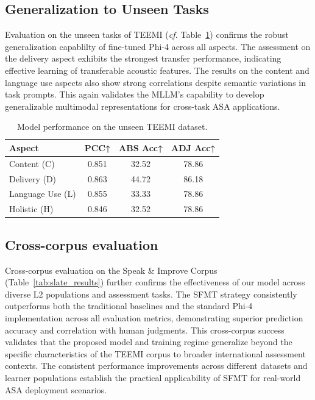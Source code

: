 \documentclass[conference]{IEEEtran}
\begin{document}
\subsection{Generalization to Unseen Tasks}
Evaluation on the unseen tasks of TEEMI (\textit{cf.} Table~\ref{tab:unseen_results}) confirms the robust generalization capablilty of fine-tuned Phi-4 across all aspects. The assessment on the delivery aspect exhibits the strongest transfer performance, indicating effective learning of transferable acoustic features. The results on the content and language use aspects also show strong correlations despite semantic variations in task prompts. This again validates the MLLM's capability to develop generalizable multimodal representations for cross-task ASA applications.

\begin{table}[!ht]
\centering
\caption{Model performance on the unseen TEEMI dataset.}
\label{tab:unseen_results}
\begin{tabular}{@{}l ccc@{}}
\toprule
\textbf{Aspect} & \textbf{PCC↑} & \textbf{ABS Acc↑} & \textbf{ADJ Acc↑} \\
\midrule
Content (C)      & 0.851         & 32.52             & 78.86             \\
Delivery (D) & 0.863         & 44.72             & 86.18             \\
Language Use (L)   & 0.855         & 33.33             & 78.86             \\
Holistic (H)     & 0.846         & 32.52             & 78.86             \\
\bottomrule
\end{tabular}
\end{table}

\subsection{Cross-corpus evaluation}
Cross-corpus evaluation on the Speak \& Improve Corpus (Table~\ref{tab:slate_results}) further confirms the effectiveness of our model across diverse L2 populations and assessment tasks. The SFMT strategy consistently outperforms both the traditional baselines and the standard Phi-4 implementation across all evaluation metrics, demonstrating superior prediction accuracy and correlation with human judgments. This cross-corpus success validates that the proposed model and training regime generalize beyond the specific characteristics of the TEEMI corpus to broader international assessment contexts. The consistent performance improvements across different datasets and learner populations establish the practical applicability of SFMT for real-world ASA deployment scenarios.
\end{document}
